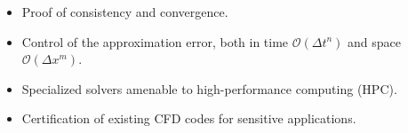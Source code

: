 \documentclass[aspectratio=169,compress,12pt,dvipsnames]{beamer}
\begin{document}
\begin{frame}
\begin{minipage}{.68\textwidth}
    \begin{itemize}
      \item Proof of consistency and convergence.
        \par
      \item Control of the approximation error, both in time $\mathcal{O}(\Delta t^n)$ and space $\mathcal{O}(\Delta x^m)$.
        \par
      \item Specialized solvers amenable to high-performance computing (HPC).
        \par
      \item Certification of existing CFD codes for sensitive applications.
    \end{itemize}
  \end{minipage}
\end{frame}
\end{document}
